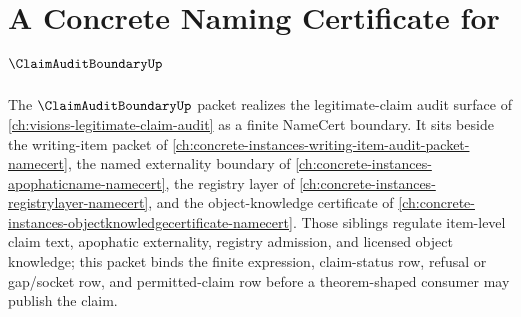 \chapter{A Concrete Naming Certificate for $\ClaimAuditBoundaryUp$}
\label{ch:concrete-instances-claim-audit-boundary-namecert}

The $\ClaimAuditBoundaryUp$ packet realizes the legitimate-claim audit surface of \autoref{ch:visions-legitimate-claim-audit} as a finite NameCert boundary. It sits beside the writing-item packet of \autoref{ch:concrete-instances-writing-item-audit-packet-namecert}, the named externality boundary of \autoref{ch:concrete-instances-apophaticname-namecert}, the registry layer of \autoref{ch:concrete-instances-registrylayer-namecert}, and the object-knowledge certificate of \autoref{ch:concrete-instances-objectknowledgecertificate-namecert}. Those siblings regulate item-level claim text, apophatic externality, registry admission, and licensed object knowledge; this packet binds the finite expression, claim-status row, refusal or gap/socket row, and permitted-claim row before a theorem-shaped consumer may publish the claim.

